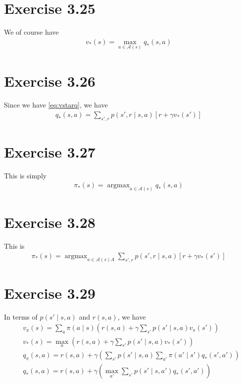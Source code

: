 \documentclass[a4paper,11pt,reqno]{amsart}
\begin{document}
\section*{Exercise 3.25}
We of course have
 \begin{align}
v_{*}(s) = \max_{a \in \mathcal{A}(s)}q_{*}(s, a) \label{eq:vstarq}
\end{align}

\section*{Exercise 3.26}
Since we have \eqref{eq:vstarq}, we have
\begin{align}
q_{*}(s, a) = \sum_{s', r} p(s', r  \mid s, a) \left[ r + \gamma v_{*}(s') \right] 
\end{align}

\section*{Exercise 3.27}
This is simply
\begin{align}
\pi _{*}(s) = \operatorname{argmax}_{a \in \mathcal{A}(s)} q_{*}(s, a)
\end{align}

\section*{Exercise 3.28}
This is 
\begin{align}
\pi _{*}(s) = \operatorname{argmax}_{a \in \mathcal{A}(s)A} \sum_{s', r} p(s', r  \mid s, a) \left[ r + \gamma v_{*}(s') \right]
\end{align}

\section*{Exercise 3.29}
In terms of $p(s' \mid s, a)$ and $r(s, a)$, we have
\begin{align}
    &v_{\pi }(s) = \sum_{a} \pi (a \mid s) \left( r(s, a) + \gamma  \sum_{s'}  
    p(s' \mid s, a) v_{\pi }(s')
\right) \\
    &v_{* }(s) = \max_{a} \left( r(s, a) + \gamma  \sum_{s'}  
    p(s' \mid s, a) v_{*}(s')
\right) \\
    &q_{\pi }(s, a) = r(s, a) + \gamma \left( \sum_{s'}p(s' \mid s, a) \sum_{a'}\pi (a' \mid s') q_{*}(s', a')   \right) \\
   &q_{*}(s, a) = r(s, a) + \gamma \left( \max_{a'} \sum_{s'}p(s' \mid s, a')q_{*}(s', a')  \right) 
\end{align}
\end{document}
